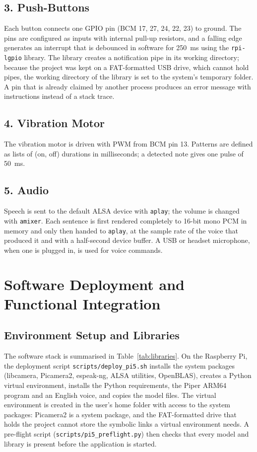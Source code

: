 \subsection*{3. Push-Buttons}
Each button connects one GPIO pin (BCM 17, 27, 24, 22, 23) to ground. The pins are configured as inputs with internal pull-up resistors, and a falling edge generates an interrupt that is debounced in software for 250~ms using the \texttt{rpi-lgpio} library. The library creates a notification pipe in its working directory; because the project was kept on a FAT-formatted USB drive, which cannot hold pipes, the working directory of the library is set to the system's temporary folder. A pin that is already claimed by another process produces an error message with instructions instead of a stack trace.

\subsection*{4. Vibration Motor}
The vibration motor is driven with PWM from BCM pin 13. Patterns are defined as lists of (on, off) durations in milliseconds; a detected note gives one pulse of 50~ms.

\subsection*{5. Audio}
Speech is sent to the default ALSA device with \texttt{aplay}; the volume is changed with \texttt{amixer}. Each sentence is first rendered completely to 16-bit mono PCM in memory and only then handed to \texttt{aplay}, at the sample rate of the voice that produced it and with a half-second device buffer. A USB or headset microphone, when one is plugged in, is used for voice commands.

\section{Software Deployment and Functional Integration}

\subsection{Environment Setup and Libraries}
The software stack is summarised in Table~\ref{tab:libraries}. On the Raspberry Pi, the deployment script \texttt{scripts/deploy\_pi5.sh} installs the system packages (libcamera, Picamera2, espeak-ng, ALSA utilities, OpenBLAS), creates a Python virtual environment, installs the Python requirements, the Piper ARM64 program and an English voice, and copies the model files. The virtual environment is created in the user's home folder with access to the system packages: Picamera2 is a system package, and the FAT-formatted drive that holds the project cannot store the symbolic links a virtual environment needs. A pre-flight script (\texttt{scripts/pi5\_preflight.py}) then checks that every model and library is present before the application is started.

